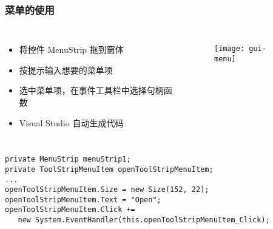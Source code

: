 \begin{frame}[fragile]
\frametitle{菜单的使用}
\begin{columns}
  \begin{itemize}
  \item 将控件 MenuStrip 拖到窗体
  \item 按提示输入想要的菜单项
  \item 选中菜单项，在事件工具栏中选择句柄函数
  \item Visual Studio 自动生成代码
  \end{itemize}
  \begin{figure}[htbp]
    \centering
    \texttt{[image: gui-menu]}
  \end{figure}
\end{columns}
\begin{lstlisting}
private MenuStrip menuStrip1;
private ToolStripMenuItem openToolStripMenuItem;
...
openToolStripMenuItem.Size = new Size(152, 22);
openToolStripMenuItem.Text = "Open";
openToolStripMenuItem.Click += 
   new System.EventHandler(this.openToolStripMenuItem_Click);
\end{lstlisting}
\end{frame}



